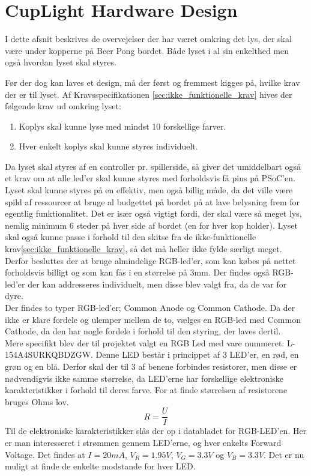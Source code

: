\documentclass[HardwareDesign/HardwareDesign_main.tex]{subfiles}
\begin{document}
\section{CupLight Hardware Design}\label{sec:cuplight_hw_design}
 I dette afsnit beskrives de overvejelser der har været omkring det lys, der skal være under kopperne på Beer Pong bordet. Både lyset i al sin enkelthed men også hvordan lyset skal styres.
 
Før der dog kan laves et design, må der først og fremmest kigges på, hvilke krav der er til lyset. Af Kravsspecifikationen \ref{sec:ikke_funktionelle_krav} hives der følgende krav ud omkring lyset:
\begin{enumerate}
    \item Koplys skal kunne lyse med mindst 10 forskellige farver.
    \item Hver enkelt koplys skal kunne styres individuelt.
\end{enumerate}
Da lyset skal styres af en controller pr. spillerside, så giver det umiddelbart også et krav om at alle led'er skal kunne styres med forholdsvis få pins på PSoC'en. 
\\Lyset skal kunne styres på en effektiv, men også billig måde, da det ville være spild af ressourcer at bruge al budgettet på bordet på at lave belysning frem for egentlig funktionalitet. Det er især også vigtigt fordi, der skal være så meget lys, nemlig minimum 6 steder på hver side af bordet (en for hver kop holder). Lyset skal også kunne passe i forhold til den skitse fra de ikke-funktionelle krav\ref{sec:ikke_funktionelle_krav}, så det må heller ikke fylde særligt meget. Derfor besluttes der at bruge almindelige RGB-led'er, som kan købes på nettet forholdsvis billigt og som kan fås i en størrelse på 3mm. Der findes også RGB-led'er der kan addresseres individuelt, men disse blev valgt fra, da de var for dyre. 
\\Der findes to typer RGB-led'er; Common Anode og Common Cathode. Da der ikke er klare fordele og ulemper mellem de to, vælges en RGB-led med Common Cathode, da den har nogle fordele i forhold til den styring, der laves dertil. 
\\Mere specifikt blev der til projektet valgt en RGB Led med vare nummeret: \textsc{L-154A4SURKQBDZGW}\cite{}. Denne LED består i princippet af 3 LED'er, en rød, en grøn og en blå. Derfor skal der til 3 af benene forbindes resistorer, men disse er nødvendigvis ikke samme størrelse, da LED'erne har forskellige elektroniske karakteristikker i forhold til deres farve. For at finde størrelsen af resistorene bruges Ohms lov.
\begin{equation}
    R=\frac{U}{I}
\end{equation}
Til de elektroniske karakteristikker slås der op i databladet for RGB-LED'en. Her er man interesseret i strømmen gennem LED'erne, og hver enkelts Forward Voltage. Det findes at $I=20mA$, $V_R=1.95V$, $V_G=3.3V$ og $V_B=3.3V$. Det er nu muligt at finde de enkelte modstande for hver LED.
\end{document}
